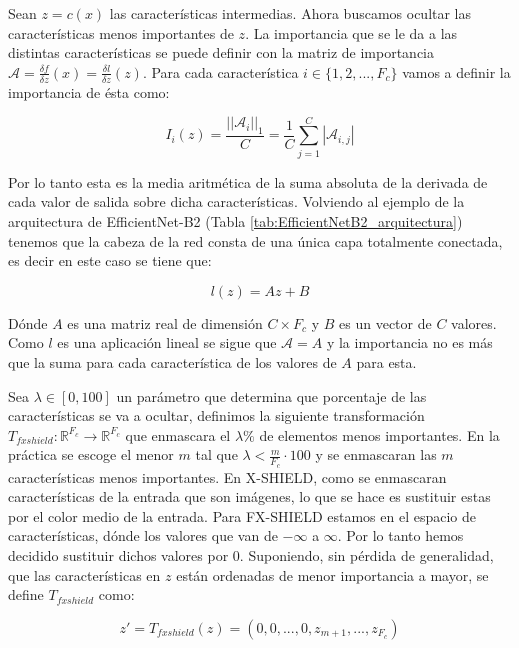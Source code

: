 Sean $z=c(x)$ las características intermedias. Ahora buscamos ocultar las características menos importantes de $z$. La importancia que se le da a las distintas características se puede definir con la matriz de importancia $\mathcal{A} = \frac{\delta f}{\delta z}(x) = \frac{\delta l}{\delta z}(z)$. Para cada característica $i \in \{1,2,...,F_c\}$ vamos a definir la importancia de ésta como:

\begin{equation}
I_i(z) =  \frac{||\mathcal{A}_i||_1}{C} = \frac{1}{C}\sum_{j=1}^C |\mathcal{A}_{i,j}| 
\end{equation}

Por lo tanto esta es la media aritmética de la suma absoluta de la derivada de cada valor de salida sobre dicha características. Volviendo al ejemplo de la arquitectura de EfficientNet-B2 (Tabla \ref{tab:EfficientNetB2_arquitectura}) tenemos que la cabeza de la red consta de una única capa totalmente conectada, es decir en este caso se tiene que:

\begin{equation}
l(z) = Az + B
\end{equation}

Dónde $A$ es una matriz real de dimensión $C\times F_c$ y $B$ es un vector de $C$ valores. Como $l$ es una aplicación lineal se sigue que $\mathcal{A}=A$ y la importancia no es más que la suma para cada característica de los valores de $A$ para esta.

Sea $\lambda\in [0,100]$ un parámetro que determina que porcentaje de las características se va a ocultar, definimos la siguiente transformación $T_{fxshield}: \mathbb{R}^{F_c} \rightarrow \mathbb{R}^{F_c}$ que enmascara el $\lambda \%$ de elementos menos importantes. En la práctica se escoge el menor $m$ tal que $\lambda < \frac{m}{F_c} \cdot 100$ y se enmascaran las $m$ características menos importantes. En X-SHIELD, como se enmascaran características de la entrada que son imágenes, lo que se hace es sustituir estas por el color medio de la entrada. Para FX-SHIELD estamos en el espacio de características, dónde los valores que van de $-\infty$ a $\infty$. Por lo tanto hemos decidido sustituir dichos valores por $0$. Suponiendo, sin pérdida de generalidad, que las características en $z$ están ordenadas de menor importancia a mayor, se define $T_{fxshield}$ como:

\begin{equation}
z' = T_{fxshield}(z) = (0,0,...,0,z_{m+1},...,z_{F_c})
\end{equation}

